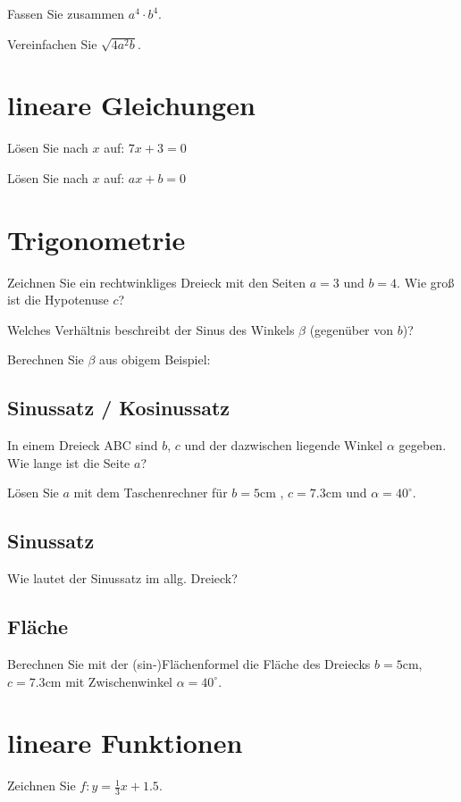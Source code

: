 Fassen Sie zusammen $a^4 \cdot{} b^4$. 

Vereinfachen Sie $\sqrt{4a^2b}$. 

\section{lineare Gleichungen}
Lösen Sie nach $x$ auf: $7x+3=0$ 

Lösen Sie nach $x$ auf: $ax + b = 0$ 

\section{Trigonometrie}
Zeichnen Sie ein rechtwinkliges Dreieck mit den Seiten $a=3$ und $b=4$.
Wie groß ist die Hypotenuse $c$? 

Welches Verhältnis beschreibt der Sinus des Winkels $\beta$ (gegenüber von $b$)?

Berechnen Sie $\beta$ aus obigem Beispiel: 


\subsection{Sinussatz / Kosinussatz}
In einem Dreieck ABC sind $b$, $c$ und der dazwischen liegende Winkel $\alpha$ gegeben. Wie lange ist die Seite $a$?

Lösen Sie $a$ mit dem Taschenrechner für $b=5$cm , $c=7.3$cm und $\alpha=40^{\circ{}}$. 

\subsection{Sinussatz}
Wie lautet der Sinussatz im allg. Dreieck?

\subsection{Fläche}
Berechnen Sie mit der (sin-)Flächenformel die Fläche des Dreiecks $b = 5$cm, $c=7.3$cm mit Zwischenwinkel $\alpha{} = 40^{\circ{}}$. 

\section{lineare Funktionen}
Zeichnen Sie $f: y=\frac{1}{3}x+1.5$.

